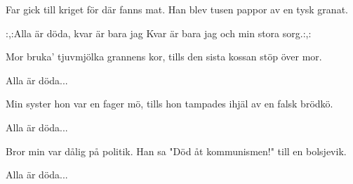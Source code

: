 


	
\beginverse*		%
Far gick till kriget för där fanns mat.
Han blev tusen pappor av en tysk granat.
\endverse			%

\beginchorus
:,:Alla är döda, kvar är bara jag
Kvar är bara jag och min stora sorg.:,:
\endchorus

\beginverse*		%
Mor bruka' tjuvmjölka grannens kor,
tills den sista kossan stöp över mor.
\endverse			%

\beginchorus
Alla är döda...
\endchorus

\beginverse*		%
Min syster hon var en fager mö,
tills hon tampades ihjäl av en falsk brödkö.
\endverse			%

\beginchorus
Alla är döda...
\endchorus

\beginverse*		%
Bror min var dålig på politik.
Han sa "Död åt kommunismen!" till en bolsjevik.
\endverse			%

\beginchorus
Alla är döda...
\endchorus
\endsong			%

